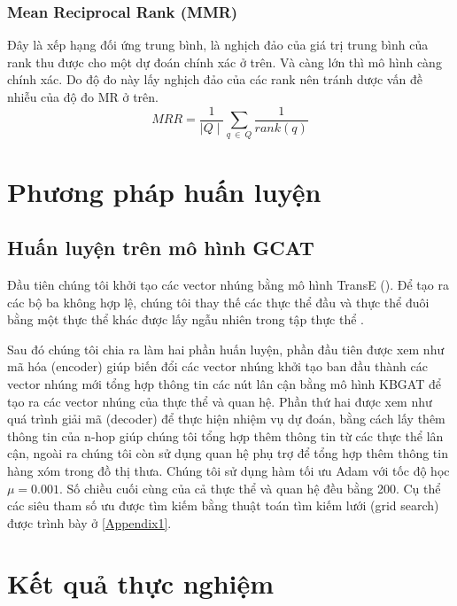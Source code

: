 \subsubsection{Mean Reciprocal Rank (MMR)}

Đây là xếp hạng đối ứng trung bình, là nghịch đảo của giá trị trung bình của rank thu được cho một dự đoán chính xác ở trên. Và càng lớn thì mô hình càng chính xác. Do độ đo này lấy nghịch đảo của các rank nên tránh dược vấn đề nhiễu của độ đo MR ở trên.
\[MRR =\frac{1}{\mid Q \mid} \sum_{q~ \in ~Q} \frac{1}{rank(q)}\]

\section{Phương pháp huấn luyện}



\subsection{Huấn luyện trên mô hình GCAT}

Đầu tiên chúng tôi khởi tạo các vector nhúng bằng mô hình TransE (\cite{bordes2013translating}). Để tạo ra các bộ ba không hợp lệ, chúng tôi thay thế các thực thể đầu và thực thể đuôi bằng một thực thể khác được lấy ngẫu nhiên trong tập thực thể .

Sau đó chúng tôi chia ra làm hai phần huấn luyện, phần đầu tiên được xem như mã hóa (encoder) giúp biến đổi các vector nhúng khởi tạo ban đầu thành các vector nhúng mới tổng hợp thông tin các nút lân cận bằng mô hình KBGAT để tạo ra các vector nhúng của thực thể và quan hệ. Phần thứ hai được xem như quá trình giải mã (decoder) để thực hiện nhiệm vụ dự đoán, bằng cách lấy thêm thông tin của n-hop giúp chúng tôi tổng hợp thêm thông tin từ các thực thể lân cận, ngoài ra chúng tôi còn sử dụng quan hệ phụ trợ để tổng hợp thêm thông tin hàng xóm trong đồ thị thưa. Chúng tôi sử dụng hàm tối ưu Adam với tốc độ học $\mu = 0.001$. Số chiều cuối cùng của cả thực thể và quan hệ đều bằng 200. Cụ thể các siêu tham số ưu được tìm kiếm bằng thuật toán tìm kiếm lưới (grid search) được trình bày ở \appendixname\ref{Appendix1}.

\section{Kết quả thực nghiệm}
\label{sec:Experiment}

